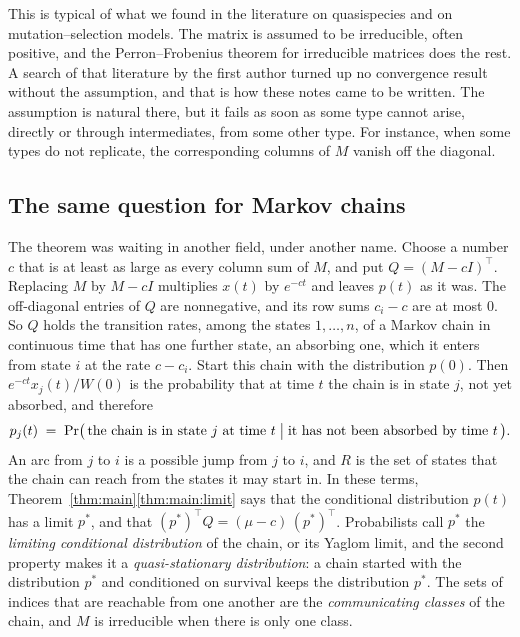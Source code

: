 \documentclass[11pt]{article}
\theoremstyle{definition}
\theoremstyle{remark}
\newcommand{\T}{\top}
\begin{document}
This is typical of what we found in the literature on quasispecies and on mutation--selection
models. The matrix is assumed to be irreducible, often positive, and the Perron--Frobenius
theorem for irreducible matrices does the rest. A search of that literature by the first author
turned up no convergence result without the assumption, and that is how these notes came to be
written. The assumption is natural there, but it fails as soon as some type cannot arise,
directly or through intermediates, from some other type. For instance, when some types do not
replicate, the corresponding columns of $M$ vanish off the diagonal.

\subsection{The same question for Markov chains}\label{sec:related:markov}

The theorem was waiting in another field, under another name. Choose a number $c$ that is at
least as large as every column sum of $M$, and put $Q = (M - cI)^\T$. Replacing $M$ by $M - cI$
multiplies $x(t)$ by $e^{-ct}$ and leaves $p(t)$ as it was. The off-diagonal entries of $Q$ are
nonnegative, and its row sums $c_i - c$ are at most $0$. So $Q$ holds the transition rates,
among the states $1, \dots, n$, of a Markov chain in continuous time that has one further state,
an absorbing one, which it enters from state $i$ at the rate $c - c_i$. Start this chain with
the distribution $p(0)$. Then $e^{-ct} x_j(t)/W(0)$ is the probability that at time $t$ the
chain is in state $j$, not yet absorbed, and therefore
\[
  p_j(t) \;=\; \Pr\bigl(\,\text{the chain is in state $j$ at time $t$}
               \bigm| \text{it has not been absorbed by time $t$}\,\bigr) .
\]
An arc from $j$ to $i$ is a possible jump from $j$ to $i$, and $R$ is the set of states that the
chain can reach from the states it may start in. In these terms,
Theorem~\ref{thm:main}\ref{thm:main:limit} says that the conditional distribution $p(t)$ has a
limit $p^*$, and that $(p^*)^\T Q = (\mu - c)\,(p^*)^\T$. Probabilists call $p^*$ the
\emph{limiting conditional distribution} of the chain, or its Yaglom limit, and the second
property makes it a \emph{quasi-stationary distribution}: a chain started with the distribution
$p^*$ and conditioned on survival keeps the distribution $p^*$. The sets of indices that are
reachable from one another are the \emph{communicating classes} of the chain, and $M$ is
irreducible when there is only one class.
\end{document}
